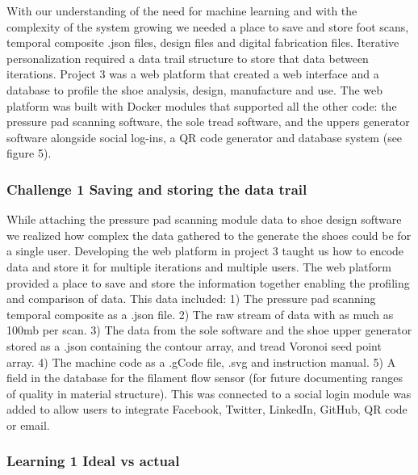 With our understanding of the need for machine learning and with the complexity of the system growing we needed a place to save and store foot scans, temporal composite .json files, design files and digital fabrication files. Iterative personalization required a data trail structure to store that data between iterations. Project 3 was a web platform that created a web interface and a database to profile the shoe analysis, design, manufacture and use. The web platform was built with Docker modules that supported all the other code: the pressure pad scanning software, the sole tread software, and the uppers generator software alongside social log-ins, a QR code generator and database system (see figure 5). 

\subsubsection{Challenge 1 Saving and storing the data trail}

While attaching the pressure pad scanning module data to shoe design software we realized how complex the data gathered to the generate the shoes could be for a single user. Developing the web platform in project 3 taught us how to encode data and store it for multiple iterations and multiple users. The web platform provided a place to save and store the information together enabling the profiling and comparison of data.
This data included: 1) The pressure pad scanning temporal composite as a .json file. 2) The raw stream of data with as much as 100mb per scan. 3) The data from the sole software and the shoe upper generator stored as a .json containing the contour array, and tread Voronoi seed point array. 4) The machine code as  a .gCode file, .svg and instruction manual. 5) A field in the database for the filament flow sensor (for future documenting ranges of quality in material structure). This was connected to a social login module was added to allow users to integrate Facebook, Twitter, LinkedIn, GitHub, QR code or email. 


\subsubsection{Learning 1 Ideal vs actual}

